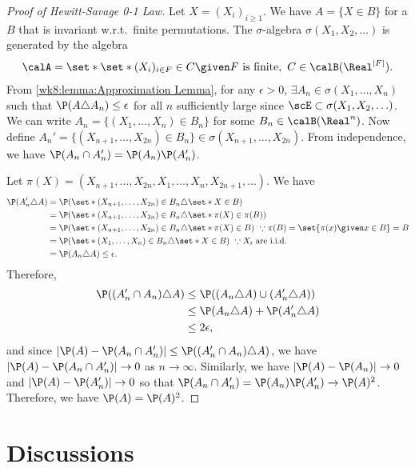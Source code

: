 \documentclass[../aipt.tex]{subfiles}
\begin{document}
\begin{proof}[Proof of Hewitt-Savage 0-1 Law]
Let $X=(X_i)_{i\geq 1}$. We have $A=\{X\in B\}$ for a $B$ that is invariant w.r.t.\ finite permutations. The $\sigma$-algebra $\sigma(X_1,X_2,\ldots)$ is generated by the algebra
\begin{align*}
\calA = \set*{\set*{(X_i)_{i\in F}\in C} \given F \text{ is finite},\ C\in \calB(\Real^{|F|})}.
\end{align*}
From \cref{wk8:lemma:Approximation Lemma}, for any $\epsilon>0$, $\exists A_n \in \sigma(X_1,\ldots,X_n)$ such that $\P(A\triangle A_n)\leq \epsilon$ for all $n$ sufficiently large since $\scE \subset \sigma(X_1,X_2,\ldots)$. We can write $A_n=\{ (X_1,\ldots, X_n)\in B_n\}$ for some $B_n\in \calB (\Real ^n)$. Now define $A_n'=\{(X_{n+1},\ldots, X_{2n})\in B_n\}\in \sigma( X_{n+1},\ldots,X_{2n})$. From independence, we have $\P(A_n\cap A_n')=\P(A_n)\P(A_n')$.  

Let $\pi(X) = (X_{n+1},\ldots,X_{2n},X_{1},\ldots,X_{n},X_{2n+1},\ldots)$. We have 
\begin{align*}
\P(A_n'\triangle A)
&=\P(\set*{(X_{n+1},\ldots,X_{2n})\in B_n}\triangle \set*{X\in B})\\
&=\P(\set*{(X_{n+1},\ldots,X_{2n})\in B_n}\triangle \set*{\pi(X)\in \pi(B)})\\
&=\P(\set*{(X_{n+1},\ldots,X_{2n})\in B_n}\triangle \set*{\pi(X)\in B})\ \because \pi(B)=\set{\pi(x)\given x\in B}=B\\
&=\P(\set*{(X_{1},\ldots,X_{n})\in B_n}\triangle \set*{X\in B})\ \because X_i \text{ are i.i.d.}\\
&=\P(A_n \triangle A) \leq \epsilon.
\end{align*}
Therefore,
\begin{align*}
\P((A_n'\cap A_n)\triangle A) &\leq \P((A_n\triangle A) \cup (A_n'\triangle A))\\
&\leq \P(A_n\triangle A) +\P (A_n'\triangle A)\\
&\leq 2\epsilon,
\end{align*}
and since $|\P(A)-\P(A_n\cap A_n')|\leq \P((A_n'\cap A_n)\triangle A)$, we have $|\P(A)-\P(A_n\cap A_n')|\to 0$ as $n \to \infty$. Similarly, we have $|\P(A)-\P(A_n)|\to 0$ and $|\P(A)-\P(A_n')|\to 0$ so that $\P(A_n\cap A_n')=\P(A_n)\P(A_n') \to \P(A)^2$. Therefore, we have $\P(A)=\P(A)^2$.
\end{proof}


\section{Discussions}
\end{document}
